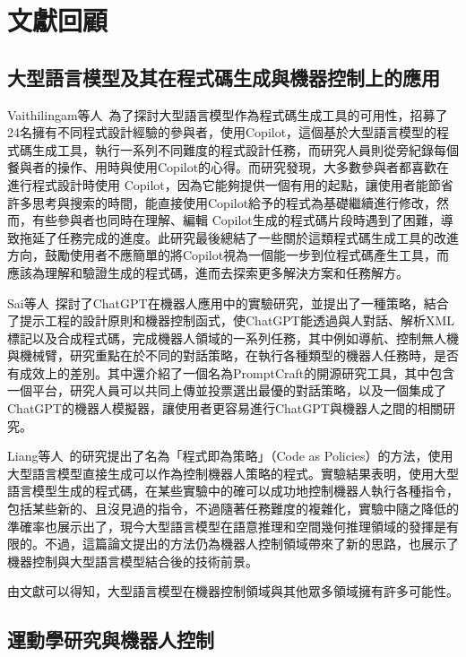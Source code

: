 \documentclass[class=NCU_thesis, crop=false]{standalone}
\begin{document}
\section{文獻回顧}
\subsection{大型語言模型及其在程式碼生成與機器控制上的應用}

Vaithilingam等人~\cite{vaithilingam2022expectation}為了探討大型語言模型作為程式碼生成工具的可用性，招募了24名擁有不同程式設計經驗的參與者，使用Copilot，這個基於大型語言模型的程式碼生成工具，執行一系列不同難度的程式設計任務，而研究人員則從旁紀錄每個餐與者的操作、用時與使用Copilot的心得。而研究發現，大多數參與者都喜歡在進行程式設計時使用 Copilot，因為它能夠提供一個有用的起點，讓使用者能節省許多思考與搜索的時間，能直接使用Copilot給予的程式為基礎繼續進行修改，然而，有些參與者也同時在理解、編輯 Copilot生成的程式碼片段時遇到了困難，導致拖延了任務完成的進度。此研究最後總結了一些關於這類程式碼生成工具的改進方向，鼓勵使用者不應簡單的將Copilot視為一個能一步到位程式碼產生工具，而應該為理解和驗證生成的程式碼，進而去探索更多解決方案和任務解方。

Sai等人~\cite{vemprala2023chatgpt}探討了ChatGPT在機器人應用中的實驗研究，並提出了一種策略，結合了提示工程的設計原則和機器控制函式，使ChatGPT能透過與人對話、解析XML標記以及合成程式碼，完成機器人領域的一系列任務，其中例如導航、控制無人機與機械臂，研究重點在於不同的對話策略，在執行各種類型的機器人任務時，是否有成效上的差別。其中還介紹了一個名為PromptCraft的開源研究工具，其中包含一個平台，研究人員可以共同上傳並投票選出最優的對話策略，以及一個集成了ChatGPT的機器人模擬器，讓使用者更容易進行ChatGPT與機器人之間的相關研究。

Liang等人~\cite{10160591}的研究提出了名為「程式即為策略」（Code as Policies）的方法，使用大型語言模型直接生成可以作為控制機器人策略的程式。實驗結果表明，使用大型語言模型生成的程式碼，在某些實驗中的確可以成功地控制機器人執行各種指令，包括某些新的、且沒見過的指令，不過隨著任務難度的複雜化，實驗中隨之降低的準確率也展示出了，現今大型語言模型在語意推理和空間幾何推理領域的發揮是有限的。不過，這篇論文提出的方法仍為機器人控制領域帶來了新的思路，也展示了機器控制與大型語言模型結合後的技術前景。


由文獻可以得知，大型語言模型在機器控制領域與其他眾多領域擁有許多可能性。

\subsection{運動學研究與機器人控制}
\end{document}
